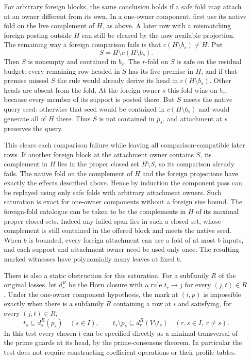 For arbitrary foreign blocks, the same conclusion
holds if a safe fold may attach at an owner different
from its own. In a one-owner component, first use its
native fold on the live complement of $H$, as above.
A later row with a mismatching foreign posting outside
$H$ can still be cleared by the now available projection.
The remaining way a foreign comparison fails is that
$c(H\setminus b_s)\ne H$. Put
\[
                   S=H\setminus c(H\setminus b_s).
\]
Then $S$ is nonempty and contained in $b_s$. The
$r$-fold on $S$ is safe on the residual budget:
every remaining row headed in $S$ has its live
premise in $H$, and if that premise missed $S$
the rule would already derive its head in
$c(H\setminus b_s)$. Other heads are absent from
the fold. At the foreign owner $s$ this fold wins
on $b_s$, because every member of its support is
posted there. But $S$ meets the native query seed:
otherwise that seed would be contained in
$c(H\setminus b_s)$ and would generate all of $H$
there. Thus $S$ is not contained in $p_s$, and
attachment at $s$ preserves the query.

This clears each comparison failure while leaving
all comparison-compatible later rows. If another
foreign block at the attachment owner contains $S$,
its complement in $H$ lies in the proper closed set
$H\setminus S$, so its comparison already fails.
The native
fold on the complement of $H$ and the foreign
projections have exactly the effects described
above. Hence by induction the component pass can
be replayed using only safe folds with arbitrary
attachment owners. Such saturation is exact for
one-owner components without a foreign size bound.
The foreign-fold catalogue can be taken to be the
complements in $H$ of its maximal proper closed sets.
Indeed any failed span lies in such a closed set,
whose complement is still contained in the offered
block and meets the native seed.
When $b$ is bounded, every foreign attachment can
use a fold of at most $b$ inputs, and each
support and attachment owner need be used only
once. The resulting marked witnesses have
polynomially many leaves at fixed $b$.

There is also a static obstruction for this saturation. For a
subfamily $R$ of the original losses, let $d_r^R$ be the Horn
closure with a rule $t_r\to j$ for every $(j,t)\in R$.
Under the one-owner component hypothesis, the mark at $(i,p)$
is impossible exactly when there is a subfamily $R$ containing
a row at $i$ and satisfying, for every $(j,t)\in R$,
\[
 t_s\subseteq d_s^R(p_s)\quad(s\in I),\qquad
 t_s\setminus p_s\subseteq d_r^R(V\setminus t_s)
       \quad(r,s\in I,\ r\ne s).
\]
In this test every chosen $t$ can be specified directly as a
minimal transversal of the prime guards at its head, by the
prime-consensus theorem. In particular the test does not require
constructing coefficient operations or their profile tables.

